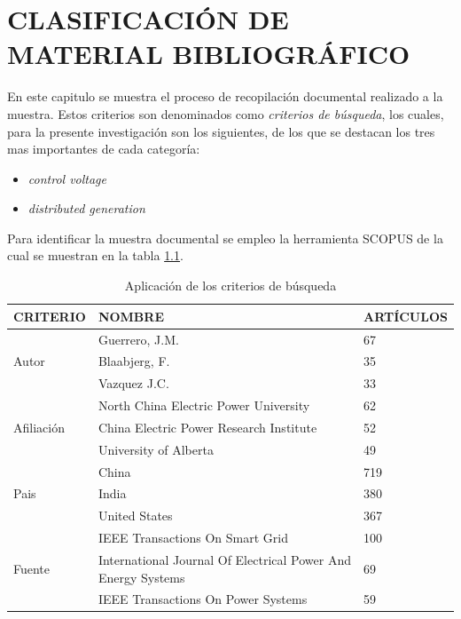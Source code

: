 \documentclass[12pt, letterpaper]{report}
\begin{document}
\chapter{CLASIFICACIÓN DE MATERIAL BIBLIOGRÁFICO}
En este capitulo se muestra el proceso de recopilación documental realizado a  la muestra. Estos criterios son denominados como \textit{criterios de búsqueda}, los cuales,  para la presente investigación son los siguientes,  de los que se destacan los tres mas importantes de cada categoría:\\
\begin{itemize}
    \item \textit{control voltage}
    \item \textit{distributed generation}
\end{itemize}
Para identificar la muestra documental se empleo la herramienta SCOPUS  de la cual se muestran en la tabla \ref{tab:criterios_busqueda }.
\begin{table}
    \caption{Aplicación de los criterios de búsqueda}
    \label{tab:criterios_busqueda }
\begin{tabular}{|l| p{8 cm}| m{2.8cm} |}
    \hline
    CRITERIO & NOMBRE &  ARTÍCULOS \\\hline
    \multirow{3}{4cm}{Autor} & Guerrero, J.M. & 67\\\cline{2-3}
    & Blaabjerg, F. & 35 \\\cline{2-3}
    & Vazquez J.C.  & 33 \\\hline
    \multirow{3}{4 cm}{Afiliación} & North China Electric Power University & 62 \\\cline{2-3}
    & China Electric Power Research Institute & 52\\\cline{2-3}
    & University of Alberta & 49 \\\hline
    \multirow{3}{4 cm}{Pais} & China & 719 \\\cline{2-3}
    &India &380 \\\cline{2-3}
    & United States & 367 \\\hline
    \multirow{3}{4 cm}{Fuente} & IEEE Transactions On Smart Grid & 100 \\\cline{2-3}
    &International Journal Of Electrical Power And Energy Systems &69 \\\cline{2-3}
    &IEEE Transactions On Power Systems &59 \\\hline
   
\end{tabular} 
\end{table}
\end{document}
